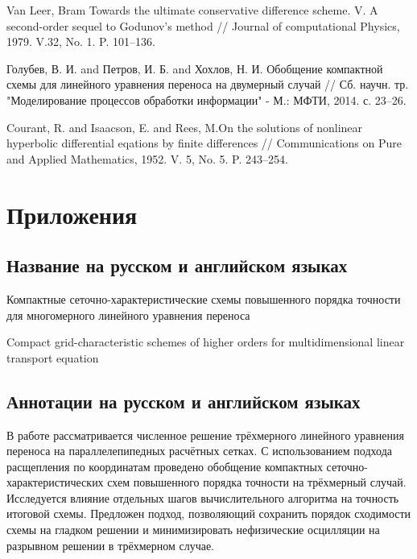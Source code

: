 \documentclass[11pt]{article}
\begin{document}
\begin{thebibliography}{99}
Van Leer, Bram Towards the ultimate conservative difference scheme. V. A second-order sequel to Godunov's method // Journal of computational Physics, 1979. V.32, No. 1. P. 101--136.

Голубев, В. И. and Петров, И. Б. and Хохлов, Н. И. Обобщение компактной схемы для линейного уравнения переноса на двумерный случай // Сб. научн. тр. "Моделирование процессов обработки информации" - М.: МФТИ, 2014. с. 23--26.

Courant, R. and Isaacson, E. and Rees, M.On the solutions of nonlinear hyperbolic differential eqations by finite differences // Communications on Pure and Applied Mathematics, 1952. V. 5, No. 5. P. 243--254.

\end{thebibliography}


\section {Приложения}

\subsection {Название на русском и английском языках}

Компактные сеточно-характеристические схемы повышенного порядка точности для многомерного линейного уравнения переноса

Compact grid-characteristic schemes of higher orders for multidimensional linear transport equation

\subsection {Аннотации на русском и английском языках}
В работе рассматривается численное решение трёхмерного линейного уравнения переноса на параллелепипедных расчётных сетках.
С использованием подхода расщепления по координатам проведено обобщение компактных сеточно-характеристических схем повышенного порядка точности на трёхмерный случай.
Исследуется влияние отдельных шагов вычислительного алгоритма на точность итоговой схемы.
Предложен подход, позволяющий сохранить порядок сходимости схемы на гладком решении и минимизировать нефизические осцилляции на разрывном решении в трёхмерном случае.

\end{document}
